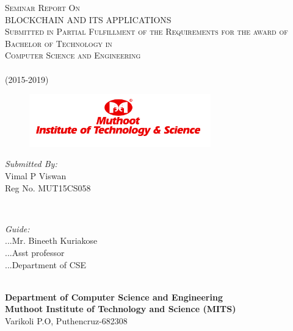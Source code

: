 \documentclass[12pt]{report}
\begin{document}
\begin{titlepage}
\center

\textsc{\large Seminar Report On}\\[1.0cm] %
\textsc{\Large BLOCKCHAIN AND ITS APPLICATIONS}\\[1.0cm] %
\textsc{\large Submitted in Partial Fulfillment of the Requirements for the award of \\ Bachelor of Technology in \\ Computer Science and Engineering\\ \\ (2015-2019)}\\[0.5cm] 

\begin{figure}[H]
\centering
\includegraphics[width=0.7\textwidth]{logo.png}\\
\end{figure}

\vspace{2.0cm}

\begin{minipage}{0.4\textwidth}
\begin{flushleft} \large
\emph{Submitted By:}\\
\hspace{0.3cm}Vimal P Viswan\\
\hspace{0.4cm}Reg No. MUT15CS058\\
\end{flushleft}
\end{minipage}
~~~~~~~~~~~~~~~~~~~~
\begin{minipage}{0.4\textwidth}
\large
\emph{Guide:} \\
\color{white}...\color{black}Mr. Bineeth Kuriakose\\
\color{white}...\color{black}Asst professor\\
\color{white}...\color{black}Department of CSE 
\end{minipage}\\[2cm]

\textbf{Department of Computer Science and Engineering}\\
\textbf{Muthoot Institute of Technology and Science (MITS)} \\
Varikoli P.O, Puthencruz-682308
\end{titlepage}
\end{document}
